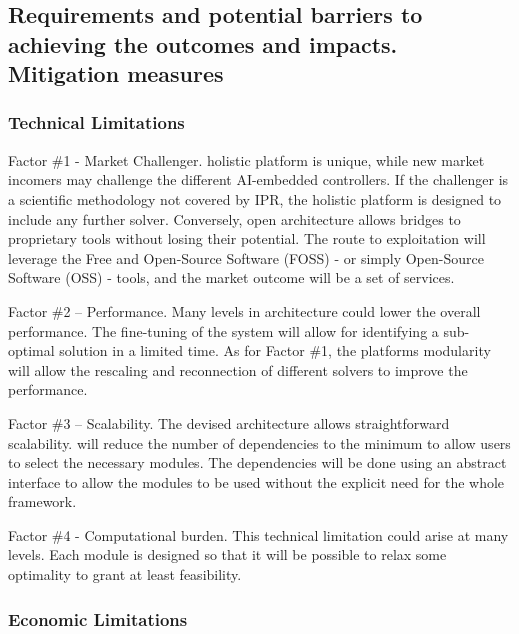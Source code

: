 \subsection{Requirements and potential barriers to achieving the
outcomes and impacts. Mitigation
measures}\label{requirements-and-potential-barriers-to-achieving-the-outcomes-and-impacts.-mitigation-measures}

\subsubsection{Technical Limitations}\label{technical-limitations}

Factor \#1 - Market Challenger. 
holistic platform is unique, while new market incomers may challenge the
different AI-embedded controllers. If the challenger is a scientific
methodology not covered by IPR, the holistic platform is designed to
include any further solver. Conversely,
 open architecture allows bridges to
proprietary tools without losing their potential. The route to
exploitation will leverage the Free and Open-Source Software (FOSS) - or
simply Open-Source Software (OSS) - tools, and the market outcome will
be a set of services.

Factor \#2 -- Performance. Many levels in architecture could lower the
overall performance. The fine-tuning of the system will allow for
identifying a sub-optimal solution in a limited time. As for Factor \#1,
the platform\textquotesingle s modularity will allow the rescaling and
reconnection of different solvers to improve the performance.

Factor \#3 -- Scalability. The devised architecture allows
straightforward scalability.  will reduce the number of
dependencies to the minimum to allow users to select the necessary
modules. The dependencies will be done using an abstract interface to
allow the modules to be used without the explicit need for the whole
framework.

Factor \#4 - Computational burden. This technical limitation could arise
at many levels. Each module is designed so that it will be possible to
relax some optimality to grant at least feasibility.

\subsubsection{Economic Limitations}\label{economic-limitations}

